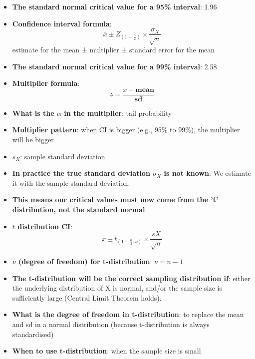 \documentclass[12pt]{book}
\begin{document}
\newpage


\pagestyle{fancy}

\begin{itemize}
\item \textbf{The standard normal critical value for a 95\% interval}: 1.96
\item \textbf{Confidence interval formula}: $$\bar{x} \pm Z_{(1-\frac{\alpha}{2})} \times \frac{\sigma_X}{\sqrt{n}}$$
estimate for the mean ± multiplier ± standard error for the mean
\item \textbf{The standard normal critical value for a 99\% interval}: 2.58
\item \textbf{Multiplier formula}: $$z = \frac{x - \textbf{mean}}{\textbf{sd}}$$
\item \textbf{What is the $\alpha$ in the multiplier}: tail probability
\item \textbf{Multiplier pattern}: when CI is bigger (e.g., 95\% to 99\%), the multiplier will be bigger
\item \textbf{$s_X$}: sample standard deviation
\item \textbf{In practice the true standard deviation $\sigma_X$ is not known}: We estimate it with the sample standard deviation.
\item \textbf{This means our critical values must now come from the 't' distribution, not the standard normal}.
\item \textbf{$t$ distribution CI}: $$\bar{x} \pm t_{(1-\frac{\alpha}{2}, \nu)} \times \frac{sX}{\sqrt{n}}$$
\item \textbf{$\nu$ (degree of freedom) for t-distribution}: $\nu = n - 1$
\item \textbf{The t-distribution will be the correct sampling distribution if}: either the underlying distribution of X is normal, and/or the sample size is sufficiently large (Central Limit Theorem holds).
\item \textbf{What is the degree of freedom in t-distribution}: to replace the mean and sd in a normal distribution (because t-distribution is always standardised)
\item \textbf{When to use t-distribution}: when the sample size is small

\end{itemize}
\end{document}
